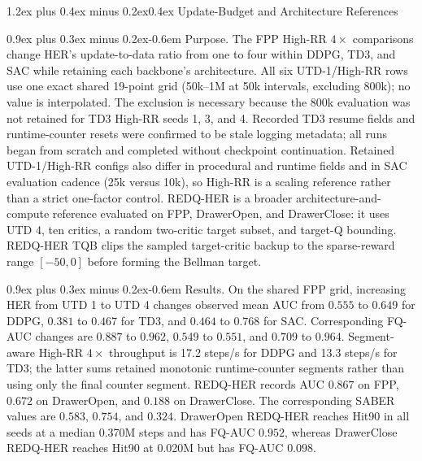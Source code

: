 \documentclass[10pt,letterpaper]{article}
\makeatletter
\renewcommand\subsection{\@startsection{subsection}{2}{0pt}%
  {1.2ex plus 0.4ex minus 0.2ex}{0.4ex}%
  {\normalfont\normalsize\bfseries}}
\renewcommand\paragraph{\@startsection{paragraph}{4}{0pt}%
  {0.9ex plus 0.3ex minus 0.2ex}{-0.6em}%
  {\normalfont\normalsize\bfseries}}
\makeatother
\begin{document}
\FloatBarrier
\subsection{Update-Budget and Architecture References}

\paragraph{Purpose.}
The FPP High-RR \(4\times\) comparisons change HER's update-to-data ratio from
one to four within DDPG, TD3, and SAC while retaining each backbone's
architecture. All six UTD-1/High-RR rows use one exact shared 19-point grid
(50k--1M at 50k intervals, excluding 800k); no value is interpolated. The
exclusion is necessary because the 800k evaluation was not retained for TD3
High-RR seeds 1, 3, and 4. Recorded TD3 resume fields and runtime-counter
resets were confirmed to be stale logging metadata; all runs began from
scratch and completed without checkpoint continuation. Retained UTD-1/High-RR
configs also differ in procedural and runtime fields and in SAC evaluation
cadence (25k versus 10k), so High-RR is a scaling reference rather than a
strict one-factor control. REDQ-HER is a broader
architecture-and-compute reference
evaluated on FPP, DrawerOpen, and DrawerClose: it uses UTD 4, ten critics, a
random two-critic target subset, and target-Q bounding. REDQ-HER TQB clips the
sampled target-critic backup to the sparse-reward range \([-50,0]\) before
forming the Bellman target.



\FloatBarrier

\paragraph{Results.}
On the shared FPP grid, increasing HER from UTD 1 to UTD 4 changes observed
mean AUC from \(0.555\) to \(0.649\) for DDPG, \(0.381\) to \(0.467\) for TD3,
and \(0.464\) to \(0.768\) for SAC. Corresponding FQ-AUC changes are
\(0.887\) to \(0.962\), \(0.549\) to \(0.551\), and \(0.709\) to \(0.964\).
Segment-aware High-RR \(4\times\) throughput is 17.2 steps/s for DDPG and
13.3 steps/s for TD3; the latter sums retained monotonic runtime-counter
segments rather than using only the final counter segment.
REDQ-HER records AUC
\(0.867\) on FPP, \(0.672\) on DrawerOpen, and \(0.188\) on DrawerClose. The
corresponding SABER values are \(0.583\), \(0.754\), and \(0.324\). DrawerOpen
REDQ-HER reaches Hit90 in all seeds at a median 0.370M steps and has FQ-AUC
\(0.952\), whereas DrawerClose REDQ-HER reaches Hit90 at 0.020M but has FQ-AUC
\(0.098\).
\end{document}
